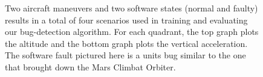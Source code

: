 \begin{figure}[h]
  \begin{subfigmatrix}{2}%
  \end{subfigmatrix}
  \caption{Two aircraft maneuvers and two software states (normal and
    faulty) results in a total of four scenarios used in training and
    evaluating our bug-detection algorithm. For each quadrant, the top
    graph plots the altitude and the bottom graph plots the vertical
    acceleration. The software fault pictured here is a units bug
    similar to the one that brought down the Mars Climbat Orbiter.}
  \label{fig:fourscenarios}
\end{figure}
